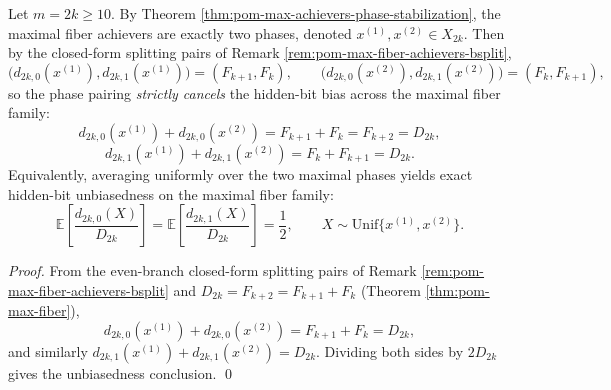 \begin{corollary}\label{cor:pom-max-fiber-hidden-bit-unbiased}
Let \(m=2k\ge 10\). By Theorem \ref{thm:pom-max-achievers-phase-stabilization}, the maximal fiber achievers are exactly two phases, denoted \(x^{(1)},x^{(2)}\in X_{2k}\).
Then by the closed-form splitting pairs of Remark \ref{rem:pom-max-fiber-achievers-bsplit},
\[
\bigl(d_{2k,0}(x^{(1)}),d_{2k,1}(x^{(1)})\bigr)=(F_{k+1},F_k),
\qquad
\bigl(d_{2k,0}(x^{(2)}),d_{2k,1}(x^{(2)})\bigr)=(F_k,F_{k+1}),
\]
so the phase pairing \emph{strictly cancels} the hidden-bit bias across the maximal fiber family:
\[
d_{2k,0}(x^{(1)})+d_{2k,0}(x^{(2)})=F_{k+1}+F_k=F_{k+2}=D_{2k},
\]
\[
d_{2k,1}(x^{(1)})+d_{2k,1}(x^{(2)})=F_k+F_{k+1}=D_{2k}.
\]
Equivalently, averaging uniformly over the two maximal phases yields exact hidden-bit unbiasedness on the maximal fiber family:
\[
\mathbb{E}\!\left[\frac{d_{2k,0}(X)}{D_{2k}}\right]
=\mathbb{E}\!\left[\frac{d_{2k,1}(X)}{D_{2k}}\right]
=\frac12,\qquad X\sim\mathrm{Unif}\{x^{(1)},x^{(2)}\}.
\]
\end{corollary}

\begin{proof}
From the even-branch closed-form splitting pairs of Remark \ref{rem:pom-max-fiber-achievers-bsplit} and \(D_{2k}=F_{k+2}=F_{k+1}+F_k\) (Theorem \ref{thm:pom-max-fiber}),
\[
d_{2k,0}(x^{(1)})+d_{2k,0}(x^{(2)})=F_{k+1}+F_k=D_{2k},
\]
and similarly \(d_{2k,1}(x^{(1)})+d_{2k,1}(x^{(2)})=D_{2k}\). Dividing both sides by \(2D_{2k}\) gives the unbiasedness conclusion. \qed
\end{proof}

